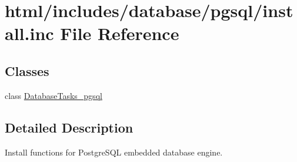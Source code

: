 \hypertarget{database_2pgsql_2install_8inc}{
\section{html/includes/database/pgsql/install.inc File Reference}
\label{database_2pgsql_2install_8inc}
}
\subsection*{Classes}
\begin{DoxyCompactItemize}
\item 
class \hyperlink{classDatabaseTasks__pgsql}{DatabaseTasks\_\-pgsql}
\end{DoxyCompactItemize}


\subsection{Detailed Description}
Install functions for PostgreSQL embedded database engine. 